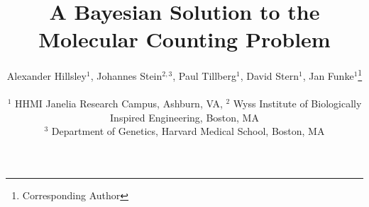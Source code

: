 \documentclass[twocolumn]{article}
\begin{document}
\title{A Bayesian Solution to the Molecular Counting Problem}

\author{
  Alexander Hillsley$^{1}$,
  Johannes Stein$^{2,3}$,
  Paul Tillberg$^{1}$,
  David Stern$^{1}$,
  Jan Funke$^{1}$\thanks{Corresponding Author}
  \\\\
  \normalsize{$^1$ HHMI Janelia Research Campus, Ashburn, VA},
  \normalsize{$^2$ Wyss Institute of Biologically Inspired Engineering, Boston, MA} \\
  \normalsize{$^3$ Department of Genetics, Harvard Medical School, Boston, MA}
  }

\maketitle











{
  \small
  
  
}

\clearpage
% 
\end{document}

